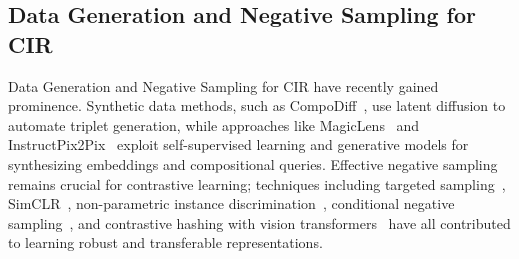 \subsection{Data Generation and Negative Sampling for CIR}
Data Generation and Negative Sampling for CIR have recently gained prominence. Synthetic data methods, such as CompoDiff~\cite{gu2024}, use latent diffusion to automate triplet generation, while approaches like MagicLens~\cite{zhang2024} and InstructPix2Pix~\cite{brooks2023} exploit self-supervised learning and generative models for synthesizing embeddings and compositional queries. Effective negative sampling remains crucial for contrastive learning; techniques including targeted sampling~\cite{feng2024,zhou2024}, SimCLR~\cite{chen2020}, non-parametric instance discrimination~\cite{wu2018}, conditional negative sampling~\cite{wu2020conditional}, and contrastive hashing with vision transformers~\cite{ren2022} have all contributed to learning robust and transferable representations.
